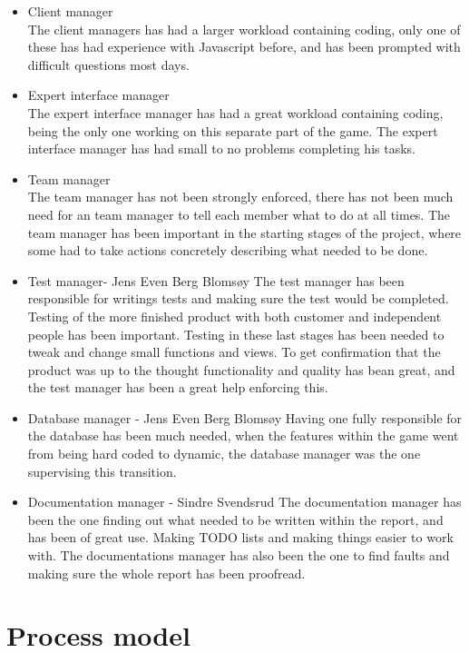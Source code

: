 \begin{itemize}
	\item Client manager\\
The client managers has had a larger workload containing coding, only one of these has had experience with Javascript before, and has been prompted with difficult questions most days.
	\item Expert interface manager\\
The expert interface manager has had a great workload containing coding, being the only one working on this separate part of the game. The expert interface manager has had small to no problems completing his tasks.
	\item Team manager\\
The team manager has not been strongly enforced, there has not been much need for an team manager to tell each member what to do at all times. The team manager has been important in the starting stages of the project, where some had to take actions concretely describing what needed to be done. 
	\item Test manager- Jens Even Berg Blomsøy
The test manager has been responsible for writings tests and making sure the test would be completed. Testing of the more finished product with both customer and independent people has been important. Testing in these last stages has been needed to tweak and change small functions and views. To get confirmation that the product was up to the thought functionality and quality has bean great, and the test manager has been a great help enforcing this.
	\item Database manager - Jens Even Berg Blomsøy
Having one fully responsible for the database has been much needed, when the features within the game went from being hard coded to dynamic, the database manager was the one supervising this transition. 
	\item Documentation manager - Sindre Svendsrud
The documentation manager has been the one finding out what needed to be written within the report, and has been of great use. Making TODO lists and making things easier to work with. The documentations manager has also been the one to find faults and making sure the whole report has been proofread.
\end{itemize}


\section{Process model}


